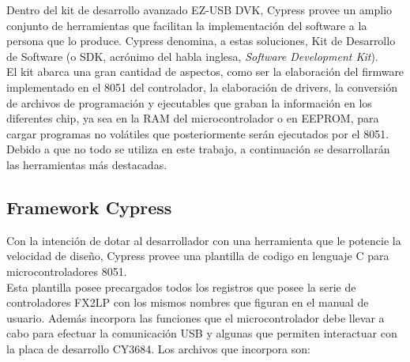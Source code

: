 Dentro del kit de desarrollo avanzado EZ-USB DVK, Cypress provee un amplio conjunto de herramientas que facilitan la implementación del software a la persona que lo produce. Cypress denomina, a estas soluciones, Kit de Desarrollo de Software (o SDK, acrónimo del habla inglesa, {\it Software Development Kit}).\\

El kit abarca una gran cantidad de aspectos, como ser la elaboración del firmware implementado en el 8051 del controlador, la elaboración de drivers, la conversión de archivos de programación y ejecutables que graban la información en los diferentes chip, ya sea en la RAM del microcontrolador o en EEPROM, para cargar programas no volátiles que posteriormente serán ejecutados por el 8051.\\

Debido a que no todo se utiliza en este trabajo, a continuación se desarrollarán las herramientas más destacadas.\\

\subsection{Framework Cypress}
	Con la intención de dotar al desarrollador con una herramienta que le potencie la velocidad de diseño, Cypress provee una plantilla de codigo en lenguaje C para microcontroladores 8051.\\
	
	Esta plantilla posee precargados todos los registros que posee la serie de controladores FX2LP con los mismos nombres que figuran en el manual de usuario. Además incorpora las funciones que el microcontrolador debe llevar a cabo para efectuar la comunicación USB y algunas que permiten interactuar con la placa de desarrollo CY3684. Los archivos que incorpora son:\\
	
